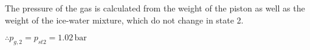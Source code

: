The pressure of the gas is calculated from the weight of the piston as well as the weight of the ice-water mixture, which do not change in state 2.  

\( \therefore p_{g,2} = p_{st2} = 1.02 \, \text{bar} \)